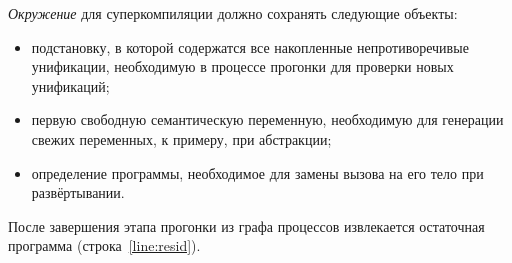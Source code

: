 
\emph{Окружение} для суперкомпиляции должно сохранять следующие объекты:
\begin{itemize}
\item подстановку, в которой содержатся все накопленные непротиворечивые унификации,
      необходимую в процессе прогонки для проверки новых унификаций;
\item первую свободную семантическую переменную, необходимую для генерации свежих переменных,
      к примеру, при абстракции;
\item определение программы, необходимое для замены вызова на его тело при развёртывании.
\end{itemize}

После завершения этапа прогонки из графа процессов извлекается остаточная программа
(строка~\ref{line:resid}).
